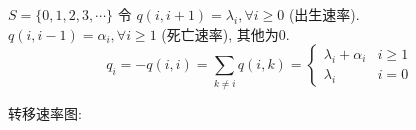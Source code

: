 \begin{example}[生灭过程]
    $S=\{0,1,2,3,\cdots\}$ 令 $q(i,i+1)=\lambda_i,\forall i\geq 0$ (出生速率). $q(i,i-1)=\alpha_i,\forall i\geq 1$ (死亡速率), 其他为0.
    \[
    q_i=-q(i,i)=\sum_{k\neq i}q(i,k)=\begin{cases}
        \lambda_i+\alpha_i & i\geq 1\\
        \lambda_i & i=0
    \end{cases}
    \]
\end{example}
转移速率图:
